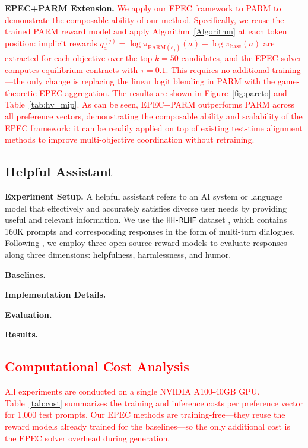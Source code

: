 \documentclass{article}
\begin{document}
\textbf{EPEC+PARM Extension.}
\textcolor{red}{We apply our EPEC framework to PARM to demonstrate the composable ability of our method. Specifically, we reuse the trained PARM reward model and apply Algorithm~\ref{Algorithm} at each token position: implicit rewards $q^{(j)}_a = \log \pi_{\mathrm{PARM}(e_j)}(a) - \log \pi_{\mathrm{base}}(a)$ are extracted for each objective over the top-$k{=}50$ candidates, and the EPEC solver computes equilibrium contracts with $\tau{=}0.1$. This requires no additional training---the only change is replacing the linear logit blending in PARM with the game-theoretic EPEC aggregation. The results are shown in Figure~\ref{fig:pareto} and Table~\ref{tab:hv_mip}. As can be seen, EPEC+PARM outperforms PARM across all preference vectors, demonstrating the composable ability and scalability of the EPEC framework: it can be readily applied on top of existing test-time alignment methods to improve multi-objective coordination without retraining.}

\subsection{Helpful Assistant}
\textbf{Experiment Setup.} A helpful assistant refers to an AI system or language model that effectively and accurately satisfies diverse user needs by providing useful and relevant information. We use the \texttt{HH-RLHF} dataset \citep{bai2022training}, which contains 160K prompts and corresponding responses in the form of multi-turn dialogues. Following \citep{yang2024metaaligner,yang2024rewards}, we employ three open-source reward models to evaluate responses along three dimensions: helpfulness, harmlessness, and humor.

\textbf{Baselines.}

\textbf{Implementation Details.}

\textbf{Evaluation.}

\textbf{Results.}

\subsection{\textcolor{red}{Computational Cost Analysis}}
\label{sec:cost}

\textcolor{red}{All experiments are conducted on a single NVIDIA A100-40GB GPU. Table~\ref{tab:cost} summarizes the training and inference costs per preference vector for 1{,}000 test prompts. Our EPEC methods are training-free---they reuse the reward models already trained for the baselines---so the only additional cost is the EPEC solver overhead during generation.}
\end{document}
